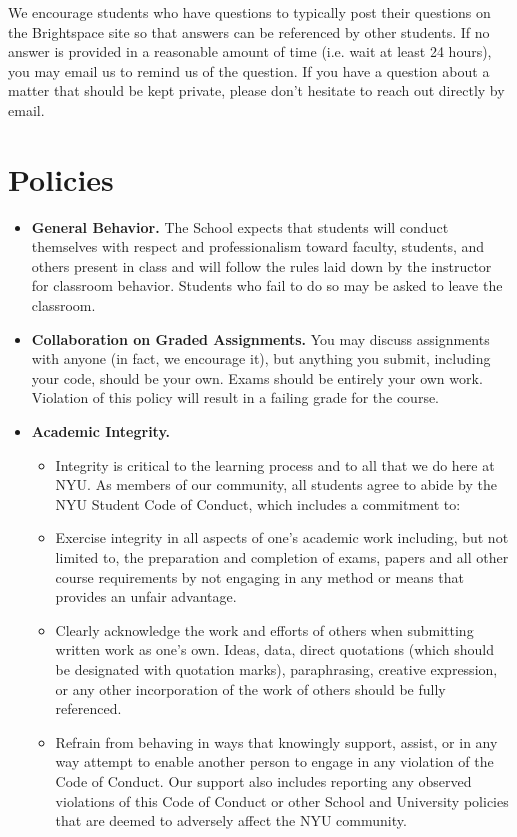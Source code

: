 \documentclass[12pt,pdftex,twoside,letterpaper]{exam}
\begin{document}
  We encourage students who have questions to typically post their questions on the Brightspace
  site so that answers can be referenced by other students. If no answer is provided in a reasonable
  amount of time (i.e. wait at least 24 hours), you may email us to remind us of the question. If you
  have a question about a matter that should be kept private, please don't hesitate to reach out
  directly by email.


\section*{Policies}

\begin{itemize}
  \item \textbf{General Behavior.} The School expects that students will conduct themselves with
        respect and professionalism toward faculty, students, and others present in class and will
        follow the rules laid down by the instructor for classroom behavior.  Students who fail to
        do so may be asked to leave the classroom.

  \item \textbf{Collaboration on Graded Assignments.} You may discuss assignments with anyone
        (in fact, we encourage it), but anything you submit, including your code, should be your
        own. Exams should be entirely your own work. Violation of this policy will result in a
        failing grade for the course.

  \item \textbf{Academic Integrity.}

  \begin{itemize}
    \item Integrity is critical to the learning process and to all that we do here at NYU. As
          members of our community, all students agree to abide by the NYU Student Code of Conduct,
          which includes a commitment to:
    \item Exercise integrity in all aspects of one's academic work including, but not limited to,
          the preparation and completion of exams, papers and all other course requirements by not
          engaging in any method or means that provides an unfair advantage.
    \item Clearly acknowledge the work and efforts of others when submitting written work as one's
          own. Ideas, data, direct quotations (which should be designated with quotation marks),
          paraphrasing, creative expression, or any other incorporation of the work of others
          should be fully referenced.
    \item Refrain from behaving in ways that knowingly support, assist, or in any way attempt to
          enable another person to engage in any violation of the Code of Conduct. Our support also
          includes reporting any observed violations of this Code of Conduct or other School and
          University policies that are deemed to adversely affect the NYU community.
  \end{itemize}


\end{itemize}
\end{document}
